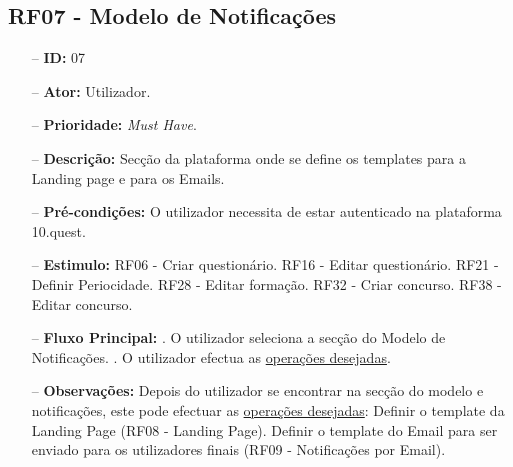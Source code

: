 \subsection{RF07 - Modelo de Notificações}
\begin{itemize}
	\item[--] \textbf{ID:} 07
	\item[--]  \textbf{Ator:} Utilizador.
	\item[--]  \textbf{Prioridade:} \textit{Must Have}.
	\item[--]  \textbf{Descrição:} Secção da plataforma onde se define os templates para a Landing page e para os Emails.
	\item[--]  \textbf{Pré-condições:} O utilizador necessita de estar autenticado na plataforma 10.quest.
	\item[--]  \textbf{Estimulo:}  
		\subitem RF06 - Criar questionário.
		\subitem RF16 - Editar questionário.
		\subitem RF21 - Definir Periocidade.
		\subitem RF28 - Editar formação.
		\subitem RF32 - Criar concurso.
		\subitem RF38 - Editar concurso.
	\item[--]  \textbf{Fluxo Principal:} 
		. O utilizador seleciona a secção do Modelo de Notificações.
		. O utilizador efectua as \underline{operações desejadas}.
	\item[--]  \textbf{Observações:} Depois do utilizador se encontrar na secção do modelo e notificações, este pode efectuar as \underline{operações desejadas}:
		\subitem Definir o template da Landing Page (RF08 - Landing Page).
		\subitem Definir o template do Email para ser enviado para os utilizadores finais (RF09 - Notificações por Email).
\end{itemize}
\newpage


